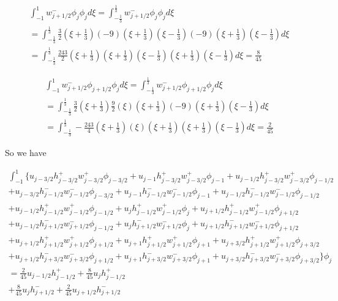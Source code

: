 \documentclass[12pt]{article}
\begin{document}
\begin{multline*}
\int_{-1}^{1}w^-_{j + 1/2}\phi_{j}\phi_{j} d\xi = \int_{-\frac{1}{3}}^{\frac{1}{3}}w^-_{j + 1/2}\phi_{j}\phi_{j} d\xi \\= \int_{-\frac{1}{3}}^{\frac{1}{3}}\frac{3}{2}\left(\xi + \frac{1}{3}\right) (-9)\left(\xi + \frac{1}{3}\right)\left(\xi - \frac{1}{3}\right)(-9)\left(\xi + \frac{1}{3}\right)\left(\xi - \frac{1}{3}\right) d\xi \\= \int_{-\frac{1}{3}}^{\frac{1}{3}}\frac{243}{2}\left(\xi + \frac{1}{3}\right) \left(\xi + \frac{1}{3}\right)\left(\xi - \frac{1}{3}\right)\left(\xi + \frac{1}{3}\right)\left(\xi - \frac{1}{3}\right) d\xi = \frac{8}{45}
\end{multline*}

\begin{multline*}
\int_{-1}^{1}w^-_{j + 1/2}\phi_{j + 1/2}\phi_{j} d\xi = \int_{-\frac{1}{3}}^{\frac{1}{3}}w^-_{j + 1/2}\phi_{j + 1/2}\phi_{j} d\xi \\= \int_{-\frac{1}{3}}^{\frac{1}{3}}\frac{3}{2}\left(\xi + \frac{1}{3}\right) \frac{9}{2}\left(\xi\right)\left(\xi + \frac{1}{3}\right)(-9)\left(\xi + \frac{1}{3}\right)\left(\xi - \frac{1}{3}\right) d\xi \\= \int_{-\frac{1}{3}}^{\frac{1}{3}}-\frac{243}{4}\left(\xi + \frac{1}{3}\right) \left(\xi\right)\left(\xi + \frac{1}{3}\right)\left(\xi + \frac{1}{3}\right)\left(\xi - \frac{1}{3}\right) d\xi = \frac{2}{45}
\end{multline*}

So we have

\begin{multline*}
\int_{-1}^{1}  \bigg\lbrace u_{j - 3/2} h^+_{j - 3/2}w^+_{j - 3/2} \phi_{j - 3/2} + u_{j - 1} h^+_{j - 3/2}w^+_{j - 3/2}\phi_{j - 1} + u_{j - 1/2} h^+_{j - 3/2}w^+_{j - 3/2}\phi_{j - 1/2}
\\ +u_{j - 3/2}h^-_{j - 1/2}w^-_{j - 1/2}\phi_{j - 3/2} + u_{j - 1}h^-_{j - 1/2}w^-_{j - 1/2}\phi_{j - 1} + u_{j - 1/2}h^-_{j - 1/2}w^-_{j - 1/2}\phi_{j - 1/2} 
\\ +u_{j - 1/2}h^+_{j - 1/2}w^+_{j - 1/2}\phi_{j - 1/2} + u_{j}h^+_{j - 1/2}w^+_{j - 1/2}\phi_{j } + u_{j + 1/2}h^+_{j - 1/2}w^+_{j - 1/2}\phi_{j + 1/2} 
\\ +u_{j - 1/2}h^-_{j + 1/2}w^-_{j + 1/2} \phi_{j - 1/2} + u_{j}h^-_{j + 1/2}w^-_{j + 1/2} \phi_{j } + u_{j + 1/2}h^-_{j + 1/2}w^-_{j + 1/2} \phi_{j + 1/2} 
\\ + u_{j + 1/2}h^+_{j + 1/2}w^+_{j + 1/2}\phi_{j + 1/2} + u_{j + 1}h^+_{j + 1/2}w^+_{j + 1/2}\phi_{j + 1} + u_{j + 3/2}h^+_{j + 1/2}w^+_{j + 1/2}\phi_{j + 3/2} 
\\ +u_{j + 1/2}h^-_{j + 3/2}w^-_{j + 3/2}\phi_{j + 1/2} + u_{j + 1}h^-_{j + 3/2}w^-_{j + 3/2}\phi_{j + 1} + u_{j + 3/2}h^-_{j + 3/2}w^-_{j + 3/2}\phi_{j + 3/2}\bigg\rbrace\phi_{j} \\= \frac{2}{45}u_{j - 1/2}h^+_{j - 1/2}  + \frac{8}{45}u_{j}h^+_{j - 1/2}  \\
 + \frac{8}{45}u_{j}h^-_{j + 1/2} +  \frac{2}{45}u_{j + 1/2}h^-_{j + 1/2}
\end{multline*}
\end{document}
